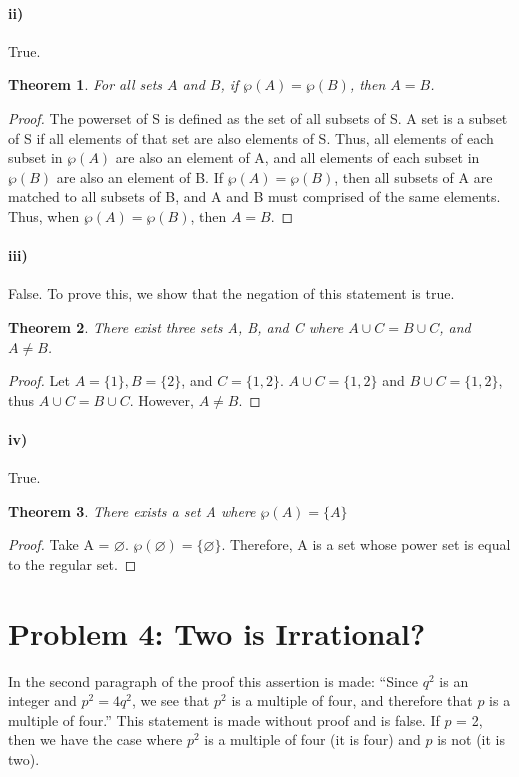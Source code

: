\documentclass[10pt,letter]{article}
\newtheorem*{thm}{Theorem}
\begin{document}
\paragraph{ii)} True. \begin{thm} For all sets $A$ and $B$, if $\wp(A) = \wp(B)$, then $A = B$.\end{thm} \begin{proof} The powerset of S is defined as the set of all subsets of S. A set is a subset of S if all elements of that set are also elements of S. Thus, all elements of each subset in $\wp(A)$ are also an element of A, and all elements of each subset in $\wp(B)$ are also an element of B. If $\wp(A) = \wp(B)$, then all subsets of A are matched to all subsets of B, and A and B must comprised of the same elements. Thus, when $\wp(A) = \wp(B)$, then $A = B$.\end{proof}

\paragraph{iii)} False. To prove this, we show that the negation of this statement is true. \begin{thm} 
There exist three sets A, B, and C where $A \cup C = B \cup C$, and $A \neq B$. \end{thm} \begin{proof} Let $A = \{1\}, B = \{2\}$, and $C = \{1,2\}$. $A \cup C = \{1,2\}$ and $B \cup C = \{1,2\}$, thus $A \cup C = B \cup C$. However, $A \neq B$. \end{proof}


\paragraph{iv)} True.
\begin{thm}
  There exists a set A where $ \wp(A) = \{A\} $
\end{thm}
\begin{proof}
   Take A = $\varnothing$.
   $\wp(\varnothing) = \{\varnothing\}$. 
   Therefore, A is a set whose power set is equal to the regular set.
\end{proof}

\section*{Problem 4: Two is Irrational?}
In the second paragraph of the proof this assertion is made: ``Since $q^2$ is an integer and $p^2 = 4q^2$, we see that $p^2$ is a multiple of four, and therefore that $p$ is a multiple of four.'' This statement is made without proof and is false. If $p$ = 2, then we have the case where $p^2$ is a multiple of four (it is four) and $p$ is not (it is two).
\end{document}
